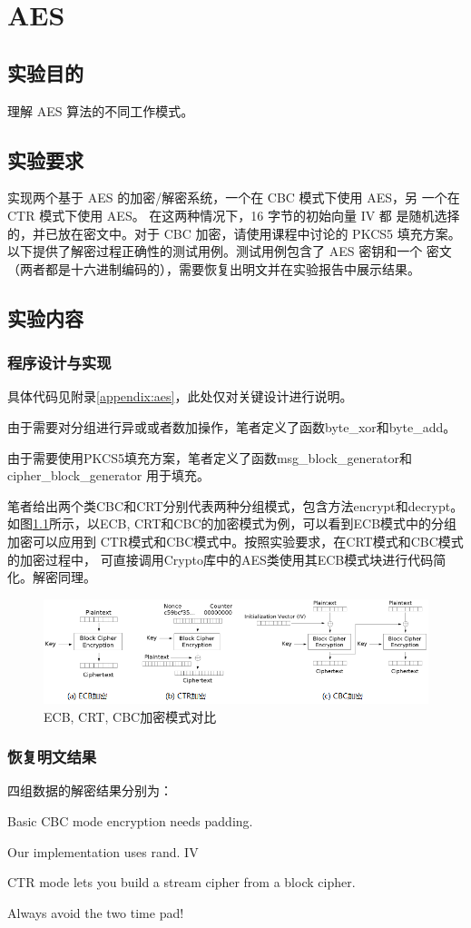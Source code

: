 \chapter{AES}

\section{实验目的}

理解 AES 算法的不同工作模式。

\section{实验要求}
实现两个基于 AES 的加密/解密系统，一个在 CBC 模式下使用 AES，另
一个在 CTR 模式下使用 AES。 在这两种情况下，16 字节的初始向量 IV 都
是随机选择的，并已放在密文中。对于 CBC 加密，请使用课程中讨论的 PKCS5
填充方案。
以下提供了解密过程正确性的测试用例。测试用例包含了 AES 密钥和一个
密文（两者都是十六进制编码的），需要恢复出明文并在实验报告中展示结果。

\section{实验内容}


\subsection{程序设计与实现}

具体代码见附录\ref{appendix:aes}，此处仅对关键设计进行说明。

由于需要对分组进行异或或者数加操作，笔者定义了函数byte\_xor和byte\_add。

由于需要使用PKCS5填充方案，笔者定义了函数msg\_block\_generator和cipher\_block\_generator
用于填充。

笔者给出两个类CBC和CRT分别代表两种分组模式，包含方法encrypt和decrypt。
如图\ref{fig:aes}所示，以ECB, CRT和CBC的加密模式为例，可以看到ECB模式中的分组加密可以应用到
CTR模式和CBC模式中。按照实验要求，在CRT模式和CBC模式的加密过程中，
可直接调用Crypto库中的AES类使用其ECB模式块进行代码简化。解密同理。

\begin{figure}[!htbp]
    \centering
    \includegraphics[width=1\textwidth]{figures/aes.png}
    \caption{ECB, CRT, CBC加密模式对比}
    \label{fig:aes}
\end{figure}

\subsection{恢复明文结果}

四组数据的解密结果分别为：

Basic CBC mode encryption needs padding.

Our implementation uses rand. IV

CTR mode lets you build a stream cipher from a block cipher.

Always avoid the two time pad!